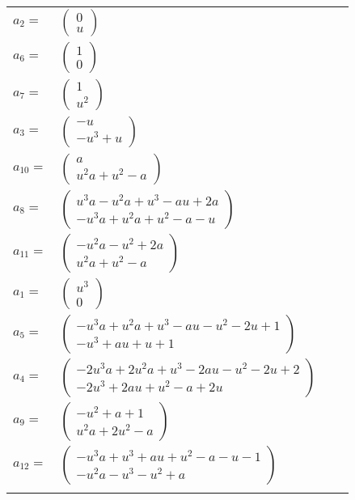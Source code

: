 \documentclass[1p]{elsarticle_modified}
\theoremstyle{definition}
\begin{document}
\begin{tabular}{m{7pt} m{180pt} m{7pt} m{180pt} }
\flushright $a_{2}=$&$\begin{pmatrix}0\\u\end{pmatrix}$ \\
\flushright $a_{6}=$&$\begin{pmatrix}1\\0\end{pmatrix}$ \\
\flushright $a_{7}=$&$\begin{pmatrix}1\\u^2\end{pmatrix}$ \\
\flushright $a_{3}=$&$\begin{pmatrix}- u\\- u^3+u\end{pmatrix}$ \\
\flushright $a_{10}=$&$\begin{pmatrix}a\\u^2 a+u^2- a\end{pmatrix}$ \\
\flushright $a_{8}=$&$\begin{pmatrix}u^3 a- u^2 a+u^3- a u+2 a\\- u^3 a+u^2 a+u^2- a- u\end{pmatrix}$ \\
\flushright $a_{11}=$&$\begin{pmatrix}- u^2 a- u^2+2 a\\u^2 a+u^2- a\end{pmatrix}$ \\
\flushright $a_{1}=$&$\begin{pmatrix}u^3\\0\end{pmatrix}$ \\
\flushright $a_{5}=$&$\begin{pmatrix}- u^3 a+u^2 a+u^3- a u- u^2-2 u+1\\- u^3+a u+u+1\end{pmatrix}$ \\
\flushright $a_{4}=$&$\begin{pmatrix}-2 u^3 a+2 u^2 a+u^3-2 a u- u^2-2 u+2\\-2 u^3+2 a u+u^2- a+2 u\end{pmatrix}$ \\
\flushright $a_{9}=$&$\begin{pmatrix}- u^2+a+1\\u^2 a+2 u^2- a\end{pmatrix}$ \\
\flushright $a_{12}=$&$\begin{pmatrix}- u^3 a+u^3+a u+u^2- a- u-1\\- u^2 a- u^3- u^2+a\end{pmatrix}$\\&\end{tabular}
\end{document}
